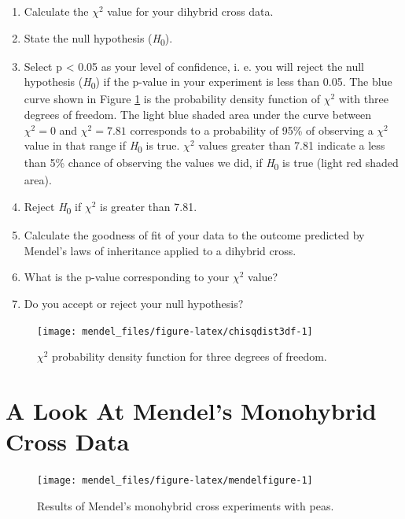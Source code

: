 \documentclass[]{book}
\providecommand{\tightlist}{%
  \setlength{\itemsep}{0pt}\setlength{\parskip}{0pt}}
\begin{document}
\begin{enumerate}
\def\labelenumi{\arabic{enumi}.}
\tightlist
\item
  Calculate the \(\chi^2\) value for your dihybrid cross data.
\item
  State the null hypothesis (\emph{H}\textsubscript{0}).
\item
  Select p \textless{} 0.05 as your level of confidence, i. e. you will
  reject the null hypothesis (\emph{H}\textsubscript{0}) if the p-value
  in your experiment is less than 0.05. The blue curve shown in Figure
  \ref{fig:chisqdist3df} is the probability density function of
  \(\chi^2\) with three degrees of freedom. The light blue shaded area
  under the curve between \(\chi^2=0\) and \(\chi^2=7.81\) corresponds
  to a probability of 95\% of observing a \(\chi^2\) value in that range
  if \emph{H}\textsubscript{0} is true. \(\chi^2\) values greater than
  7.81 indicate a less than 5\% chance of observing the values we did,
  if \emph{H}\textsubscript{0} is true (light red shaded area).
\item
  Reject \emph{H}\textsubscript{0} if \(\chi^2\) is greater than 7.81.
\item
  Calculate the goodness of fit of your data to the outcome predicted by
  Mendel's laws of inheritance applied to a dihybrid cross.
\item
  What is the p-value corresponding to your \(\chi^2\) value?
\item
  Do you accept or reject your null hypothesis?
\end{enumerate}

\begin{figure}

{\centering \texttt{[image: mendel\_files/figure-latex/chisqdist3df-1]} 

}

\caption{\(\chi^2\) probability density function for three
degrees of freedom.}\label{fig:chisqdist3df}
\end{figure}




\section{A Look At Mendel's Monohybrid Cross
Data}\label{a-look-at-mendels-monohybrid-cross-data}




\begin{figure}

{\centering \texttt{[image: mendel\_files/figure-latex/mendelfigure-1]} 

}

\caption{Results of Mendel's monohybrid cross experiments
with peas.}\label{fig:mendelfigure}
\end{figure}
\end{document}
